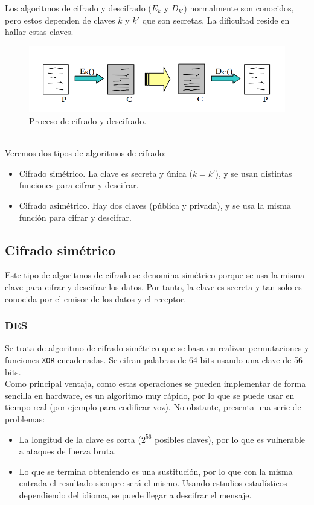 Los algoritmos de cifrado y descifrado ($E_k$ y $D_{k'}$) normalmente son conocidos, pero estos dependen de claves $k$ y $k'$ que son secretas. La dificultad reside en hallar estas claves.
\begin{figure}
    \centering
    \includegraphics[width=1\linewidth]{./images/cifrado.png}
    \caption{Proceso de cifrado y descifrado.}
    \label{fig:cifrado/descifrado}
\end{figure}~\\

Veremos dos tipos de algoritmos de cifrado:
\begin{itemize}
    \item Cifrado simétrico. La clave es secreta y única ($k=k'$), y se usan distintas funciones para cifrar y descifrar.
    \item Cifrado asimétrico. Hay dos claves (pública y privada), y se usa la misma función para cifrar y descifrar.
\end{itemize}

\subsection{Cifrado simétrico}

Este tipo de algoritmos de cifrado se denomina simétrico porque se usa la misma clave para cifrar y descifrar los datos. Por tanto, la clave es secreta y tan solo es conocida por el emisor de los datos y el receptor.

\subsubsection{\acrfull{DES}}
Se trata de algoritmo de cifrado simétrico que se basa en realizar permutaciones y funciones \verb|XOR| encadenadas. Se cifran palabras de 64 bits usando una clave de 56 bits.\\

Como principal ventaja, como estas operaciones se pueden implementar de forma sencilla en hardware, es un algoritmo muy rápido, por lo que se puede usar en tiempo real (por ejemplo para codificar voz). No obstante, presenta una serie de problemas:
\begin{itemize}
    \item La longitud de la clave es corta ($2^{56}$ posibles claves), por lo que es vulnerable a ataques de fuerza bruta.
    \item Lo que se termina obteniendo es una sustitución, por lo que con la misma entrada el resultado siempre será el mismo. Usando estudios estadísticos dependiendo del idioma, se puede llegar a descifrar el mensaje.
\end{itemize}


